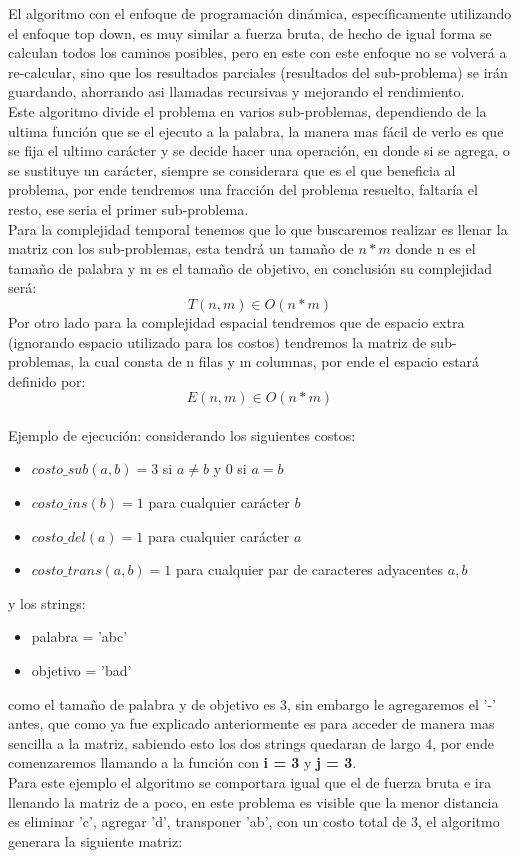 El algoritmo con el enfoque de programación dinámica, específicamente utilizando el enfoque top down, es muy similar a fuerza bruta, de hecho de igual forma se calculan todos los caminos posibles, pero en este con este enfoque no se volverá a re-calcular, sino que los resultados parciales (resultados del sub-problema) se irán guardando, ahorrando asi llamadas recursivas y mejorando el rendimiento.\\
Este algoritmo divide el problema en varios sub-problemas, dependiendo de la ultima función que se el ejecuto a la palabra, la manera mas fácil de verlo es que se fija el ultimo carácter y se decide hacer una operación, en donde si se agrega, o se sustituye un carácter, siempre se considerara que es el que beneficia al problema, por ende tendremos una fracción del problema resuelto, faltaría el resto, ese seria el primer sub-problema.\\
Para la complejidad temporal tenemos que lo que buscaremos realizar es llenar la matriz con los sub-problemas, esta tendrá un tamaño de $n*m$ donde n es el tamaño de palabra y m es el tamaño de objetivo, en conclusión su complejidad será:
\[
    T(n,m) \in O(n*m)
\]
Por otro lado para la complejidad espacial tendremos que de espacio extra (ignorando espacio utilizado para los costos) tendremos la matriz de sub-problemas, la cual consta de n filas y m columnas, por ende el espacio estará definido por:
\[
    E(n,m) \in  O(n*m)
\]
\\
Ejemplo de ejecución:
considerando los siguientes costos:
\begin{itemize}
    \item $costo\_sub(a,b) = 3$ si $a \neq b$ y $0$ si $a = b$
    \item $costo\_ins(b) = 1$ para cualquier carácter $b$
    \item $costo\_del(a) = 1$ para cualquier carácter $a$
    \item $costo\_trans(a,b) = 1$ para cualquier par de caracteres adyacentes $a, b$\\
\end{itemize} 
y los strings:
\begin{itemize}
    \item palabra = 'abc'
    \item objetivo = 'bad'\\
\end{itemize} 

como el tamaño de palabra y de objetivo es 3, sin embargo le agregaremos el '-' antes, que como ya fue explicado anteriormente es para acceder de manera mas sencilla a la matriz, sabiendo esto los dos strings quedaran de largo 4, por ende comenzaremos llamando a la función con \textbf{i = 3} y \textbf{j = 3}.\\ 
Para este ejemplo el algoritmo se comportara igual que el de fuerza bruta e ira llenando la matriz de a poco, en este problema es visible que la menor distancia es eliminar 'c', agregar 'd', transponer 'ab', con un costo total de 3, el algoritmo generara la siguiente matriz:

